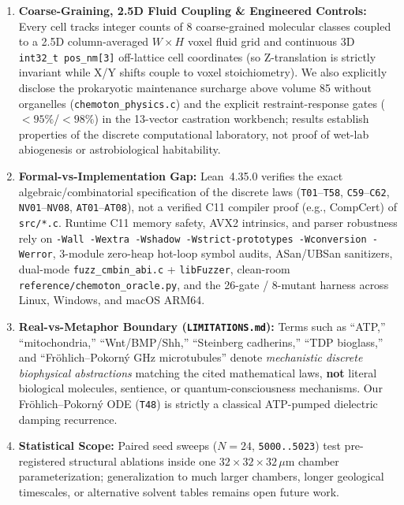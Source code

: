 \documentclass[11pt,reqno]{amsart}
\theoremstyle{plain}
\theoremstyle{definition}
\theoremstyle{remark}
\newcommand{\code}[1]{{\footnotesize\nolinkurl{#1}}}
\newcommand{\tcode}[1]{{\scriptsize\nolinkurl{#1}}}
\begin{document}
\begin{enumerate}[leftmargin=1.6em, itemsep=2pt]
  \item \textbf{Coarse-Graining, 2.5D Fluid Coupling \& Engineered Controls:} Every cell tracks integer counts of 8 coarse-grained molecular classes coupled to a 2.5D column-averaged $W\times H$ voxel fluid grid and continuous 3D \code{int32_t pos_nm[3]} off-lattice cell coordinates (so Z-translation is strictly invariant while X/Y shifts couple to voxel stoichiometry). We also explicitly disclose the prokaryotic maintenance surcharge above volume 85 without organelles (\code{chemoton_physics.c}) and the explicit restraint-response gates ($<95\%$/$<98\%$) in the 13-vector castration workbench; results establish properties of the discrete computational laboratory, not proof of wet-lab abiogenesis or astrobiological habitability.
  \item \textbf{Formal-vs-Implementation Gap:} Lean~4.35.0 verifies the exact algebraic/combinatorial specification of the discrete laws (\code{T01}--\tcode{T58}, \code{C59}--\tcode{C62}, \code{NV01}--\tcode{NV08}, \code{AT01}--\tcode{AT08}), not a verified C11 compiler proof (e.g., CompCert) of \code{src/*.c}. Runtime C11 memory safety, AVX2 intrinsics, and parser robustness rely on \texttt{-Wall -Wextra -Wshadow -Wstrict-prototypes -Wconversion -Werror}, 3-module zero-heap hot-loop symbol audits, ASan/UBSan sanitizers, dual-mode \code{fuzz_cmbin_abi.c} + \code{libFuzzer}, clean-room \code{reference/chemoton_oracle.py}, and the 26-gate / 8-mutant harness across Linux, Windows, and macOS ARM64.
  \item \textbf{Real-vs-Metaphor Boundary (\code{LIMITATIONS.md}):} Terms such as ``ATP,'' ``mitochondria,'' ``Wnt/BMP/Shh,'' ``Steinberg cadherins,'' ``TDP bioglass,'' and ``Fr\"ohlich--Pokorn\'y GHz microtubules'' denote \emph{mechanistic discrete biophysical abstractions} matching the cited mathematical laws, \textbf{not} literal biological molecules, sentience, or quantum-consciousness mechanisms. Our Fr\"ohlich--Pokorn\'y ODE (\code{T48}) is strictly a classical ATP-pumped dielectric damping recurrence.
  \item \textbf{Statistical Scope:} Paired seed sweeps ($N = 24$, \code{5000..5023}) test pre-registered structural ablations inside one $32\times 32\times 32\,\mu\mathrm{m}$ chamber parameterization; generalization to much larger chambers, longer geological timescales, or alternative solvent tables remains open future work.
\end{enumerate}
\end{document}
